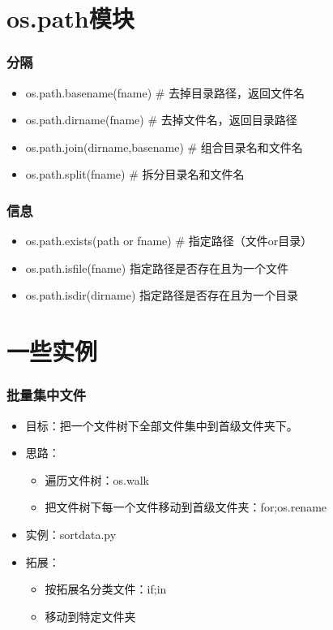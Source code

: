 \documentclass[13pt]{beamer}
\begin{document}
\section{os.path模块}
\begin{frame}
\frametitle{分隔}
\begin{itemize}
  \item<1-> os.path.basename(fname) \# 去掉目录路径，返回文件名
  \item<2-> os.path.dirname(fname)  \# 去掉文件名，返回目录路径
  \item<3-> os.path.join(dirname,basename) \# 组合目录名和文件名
  \item<4-> os.path.split(fname) \# 拆分目录名和文件名
\end{itemize}
\end{frame}

\begin{frame}
\frametitle{信息}
\begin{itemize}
  \item<1-> os.path.exists(path or fname) \# 指定路径（文件or目录）
  \item<2-> os.path.isfile(fname)  指定路径是否存在且为一个文件
  \item<3-> os.path.isdir(dirname)  指定路径是否存在且为一个目录
\end{itemize}
\end{frame}

\section{一些实例}
\begin{frame}
\frametitle{批量集中文件}
\begin{itemize}
  \item<1-> 目标：把一个文件树下全部文件集中到首级文件夹下。
  \item<2-> 思路：
  \pause
  \begin{itemize}
    \item 遍历文件树：os.walk
    \pause
    \item 把文件树下每一个文件移动到首级文件夹：for;os.rename
   \end{itemize}
  \item<3-> 实例：sortdata.py
  \item<4-> 拓展：
  \pause
  \begin{itemize}
    \item 按拓展名分类文件：if;in
    \pause
    \item 移动到特定文件夹
  \end{itemize}
\end{itemize}
\end{frame}
\end{document}
